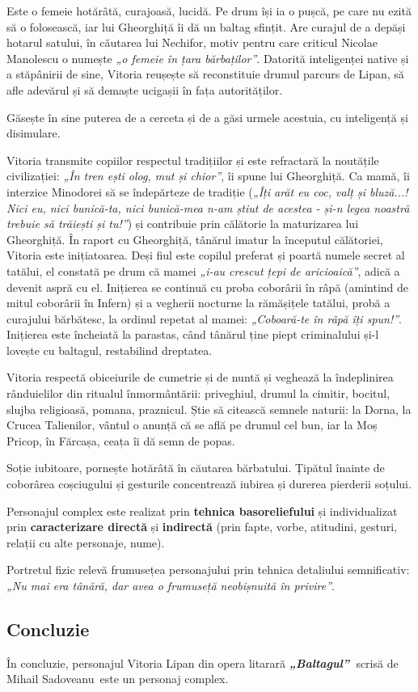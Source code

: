 \documentclass[
12pt,
a4paper
]{article}
\newcommand{\operatitle}{\textbf{\textit{„Baltagul”\ }}} %
\newcommand{\operaauthor}{Mihail Sadoveanu\ } %
\begin{document}
Este o femeie hotărâtă, curajoasă, lucidă. Pe drum își ia o pușcă, pe care nu ezită să o folosească, iar lui Gheorghiță îi dă un baltag sfințit. Are curajul de a depăși hotarul satului, în căutarea lui Nechifor, motiv pentru care criticul Nicolae Manolescu o numește \textit{„o femeie în țara bărbaților”}. Datorită inteligenței native și a stăpânirii de sine, Vitoria reușește să reconstituie drumul parcurs de Lipan, să afle adevărul și să demaște ucigașii în fața autorităților.

Găsește în sine puterea de a cerceta și de a găsi urmele acestuia, cu inteligență și disimulare.

Vitoria transmite copiilor respectul tradițiilor și este refractară la noutățile ci\-vi\-li\-za\-ți\-ei: \textit{„În tren ești olog, mut și chior”}, îi spune lui Gheorghiță. Ca mamă, îi interzice Minodorei să se îndepărteze de tradiție (\textit{„Îți arăt eu coc, valț și bluză...! Nici eu, nici bunică-ta, nici bunică-mea n-am știut de acestea - și-n legea noastră trebuie să trăiești și tu!”}) și contribuie prin călătorie la maturizarea lui Gheorghiță. În raport cu Gheorghiță, tânărul imatur la începutul călătoriei, Vitoria este inițiatoarea. Deși fiul este copilul preferat și poartă numele secret al tatălui, el constată pe drum că mamei \textit{„i-au crescut țepi de aricioaică”}, adică a devenit aspră cu el. Inițierea se continuă cu proba coborârii în râpă (amintind de mitul coborârii în Infern) și a vegherii nocturne la rămășițele tatălui, probă a curajului bărbătesc, la ordinul repetat al mamei: \textit{„Coboară-te în râpă îți spun!”}. Inițierea este încheiată la parastas, când tânărul ține piept criminalului și-l lovește cu baltagul, restabilind dreptatea.

Vitoria respectă obiceiurile de cumetrie și de nuntă și veghează la îndeplinirea rânduielilor din ritualul înmormântării: priveghiul, drumul la cimitir, bocitul, slujba religioasă, pomana, praznicul. Știe să citească semnele naturii: la Dorna, la Crucea Talienilor, vântul o anunță că se află pe drumul cel bun, iar la Moș Pricop, în Fărcașa, ceața îi dă semn de popas.

Soție iubitoare, pornește hotărâtă în căutarea bărbatului. Țipătul înainte de coborârea coșciugului și gesturile concentrează iubirea și durerea pierderii soțului.

Personajul complex este realizat prin \textbf{tehnica basoreliefului} și individualizat prin \textbf{caracterizare directă} și \textbf{indirectă} (prin fapte, vorbe, atitudini, gesturi, relații cu alte personaje, nume).

Portretul fizic relevă frumusețea personajului prin tehnica detaliului semnificativ: \textit{„Nu mai era tânără, dar avea o frumuseță neobișnuită în privire”}.

\subsection{Concluzie}

În concluzie, personajul Vitoria Lipan din opera litarară \operatitle scrisă de \operaauthor este un personaj complex.
\end{document}
